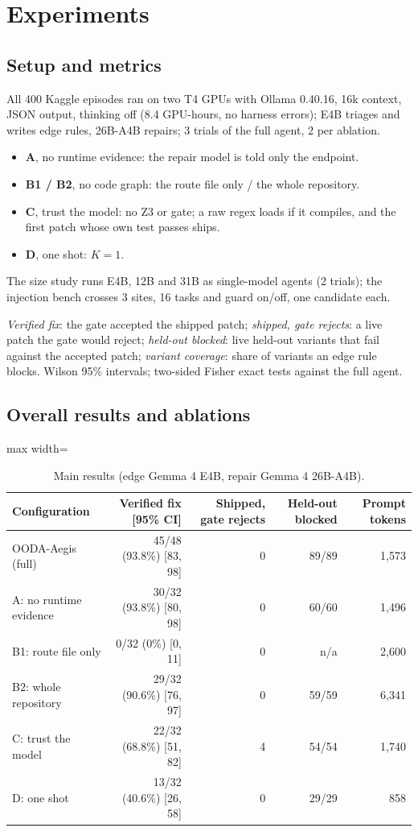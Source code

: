 \documentclass[journal]{IEEEtran}
\begin{document}
\section{Experiments}

\subsection{Setup and metrics}
All 400 Kaggle episodes ran on two T4 GPUs with Ollama 0.40.16, 16k context, JSON output, thinking off (8.4 GPU-hours, no harness errors); E4B triages and writes edge rules, 26B-A4B repairs; 3 trials of the full agent, 2 per ablation.
\begin{itemize}
\item \textbf{A}, no runtime evidence: the repair model is told only the endpoint.
\item \textbf{B1 / B2}, no code graph: the route file only / the whole repository.
\item \textbf{C}, trust the model: no Z3 or gate; a raw regex loads if it compiles, and the first patch whose own test passes ships.
\item \textbf{D}, one shot: $K = 1$.
\end{itemize}
The size study runs E4B, 12B and 31B as single-model agents (2 trials); the injection bench crosses 3 sites, 16 tasks and guard on/off, one candidate each.

\emph{Verified fix}: the gate accepted the shipped patch; \emph{shipped, gate rejects}: a live patch the gate would reject; \emph{held-out blocked}: live held-out variants that fail against the accepted patch; \emph{variant coverage}: share of variants an edge rule blocks. Wilson 95\% intervals; two-sided Fisher exact tests against the full agent.

\subsection{Overall results and ablations}

\begin{table}[!t]
\centering\small
\caption{Main results (edge Gemma 4 E4B, repair Gemma 4 26B-A4B).}
\label{tab:main}
\begin{adjustbox}{max width=\linewidth}\begin{tabular}{lrrrr}
\toprule
Configuration & Verified fix [95\% CI] & Shipped, gate rejects & Held-out blocked & Prompt tokens\\
\midrule
OODA-Aegis (full) & 45/48 (93.8\%) [83, 98] & 0 & 89/89 & 1,573\\
A: no runtime evidence & 30/32 (93.8\%) [80, 98] & 0 & 60/60 & 1,496\\
B1: route file only & 0/32 (0\%) [0, 11] & 0 & n/a & 2,600\\
B2: whole repository & 29/32 (90.6\%) [76, 97] & 0 & 59/59 & 6,341\\
C: trust the model & 22/32 (68.8\%) [51, 82] & 4 & 54/54 & 1,740\\
D: one shot & 13/32 (40.6\%) [26, 58] & 0 & 29/29 & 858\\
\bottomrule
\end{tabular}\end{adjustbox}
\end{table}
\end{document}
